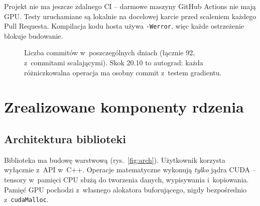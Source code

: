 \documentclass[11pt,a4paper]{article}
\begin{document}
Projekt nie ma jeszcze zdalnego CI -- darmowe maszyny GitHub Actions nie mają GPU. Testy
uruchamiane są lokalnie na docelowej karcie przed scaleniem każdego Pull Requesta.
Kompilacja kodu hosta używa \texttt{-Werror}, więc każde ostrzeżenie blokuje budowanie.

\begin{figure}[H]
\centering
{}
\caption{Liczba commitów w~poszczególnych dniach (łącznie 92, z~commitami scalającymi).
  Skok 20.10 to autograd: każda różniczkowalna operacja ma osobny commit z~testem gradientu.}
\label{fig:commits}
\end{figure}

\section{Zrealizowane komponenty rdzenia}

\subsection{Architektura biblioteki}

Biblioteka ma budowę warstwową (rys.~\ref{fig:arch}). Użytkownik korzysta wyłącznie
z~API w~C++. Operacje matematyczne wykonują \emph{tylko} jądra CUDA -- tensory w~pamięci
CPU służą do tworzenia danych, wypisywania i~kopiowania. Pamięć GPU pochodzi z~własnego
alokatora buforującego, nigdy bezpośrednio z~\texttt{cudaMalloc}.
\end{document}

